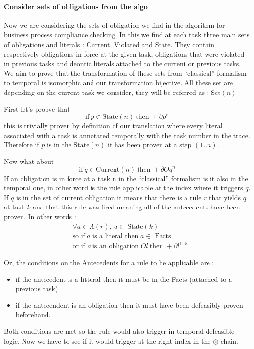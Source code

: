 \documentclass[10pt]{report}
\newcommand{\ochain}{$\otimes$-chain}
\begin{document}
\paragraph{Consider sets of obligations from the algo}
Now we are considering the sets of obligation we find in the algorithm for business process compliance checking. In this we find at each task three main sets of obligations and literals : Current, Violated and State. They contain respectively obligations in force at the given task, obligations that were violated in previous tasks and deontic literals attached to the current or previous tasks. We aim to prove that the transformation of these sets from \enquote{classical} formalism to temporal is isomorphic and our transformation bijective. All these set are depending on the current task we consider, they will be referred as : $\text{Set}(n)$

First let's proove that $$\text{if}\ p \in \text{State}(n)\ \text{then}\ +\partial p^{n} $$
this is trivially proven by definition of our translation where every literal associated with a task is annotated temporally with the task number in the trace. Therefore if $p$ is in the $\text{State}(n)$ it has been proven at a step $(1..n)$.

Now what about $$\text{if}\ q \in \text{Current}(n)\ \text{then}\ +\partial Oq^{n} $$
If an obligation is in force at a task n in the \enquote{classical} formalism is it also in the temporal one, in other word is the rule applicable at the index where it triggers $q$. If $q$ is in the set of current obligation it means that there is a rule $r$ that yields $q$ at task $k$ and that this rule was fired meaning all of the antecedents have been proven. In other words :
\begin{align*}
&\forall a \in A(r),\ a \in\ \text{State}(k) \\
& \text{so if}\ a \text{ is a literal then }   a \in \text{ Facts} \\
& \text{or if } a\ \text{is an obligation } Ol\ \text{then } +\partial l^{1..k} 
\end{align*} 

Or, the conditions on the Antecedents for a rule to be applicable are :
\begin{itemize}
\item if the antecedent is a litteral then it must be in the Facts (attached to a previous task)
\item if the antecendent is an obligation then it must have been defeasibly proven beforehand.
\end{itemize}
Both conditions are met so the rule would also trigger in temporal defeasible logic. Now we have to see if it would trigger at the right index in the \ochain.
\end{document}
